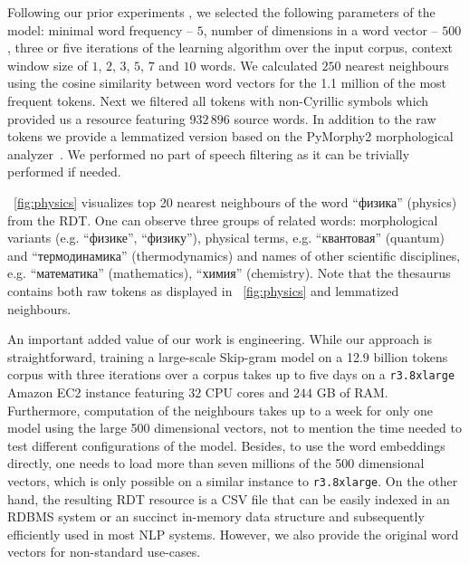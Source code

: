 \documentclass[runningheads,a4paper]{llncs}
\begin{document}
Following our prior experiments \cite{Arefyev:15}, we  selected the following parameters of the model: minimal word frequency -- $5$, number of dimensions in a word vector -- $500$, three or five iterations of the learning algorithm over the input corpus, context window size of $1$, $2$, $3$, $5$, $7$ and $10$ words. We calculated $250$ nearest neighbours using the cosine similarity between word vectors for the 1.1 million of the most frequent tokens. Next we filtered all tokens with non-Cyrillic symbols which provided us a resource featuring $932\,896$ source words. In addition to the raw tokens we provide a lemmatized version based on the PyMorphy2 morphological analyzer~\cite{Korobov:15}. We performed no part of speech filtering as it can be trivially performed if needed.  

\figurename~\ref{fig:physics} visualizes top 20  nearest neighbours of the word ``физика'' (physics) from the RDT. One can observe three groups of related words: morphological variants (e.g. ``физике'', ``физику''), physical terms, e.g. ``квантовая'' (quantum) and ``термодинамика'' (thermodynamics) and names of other scientific disciplines, e.g. ``математика'' (mathematics), ``химия'' (chemistry). Note that the thesaurus contains both raw tokens as displayed in \figurename~\ref{fig:physics} and lemmatized neighbours. 

An important added value of our work is engineering. While our approach is straightforward, training a large-scale Skip-gram model on a 12.9 billion tokens corpus with three iterations over a corpus takes up to five days on a \texttt{r3.8xlarge} Amazon EC2 instance featuring $32$ CPU cores and $244$ GB of RAM. Furthermore, computation of the neighbours takes up to a week for only one model using the large 500 dimensional vectors, not to mention the time needed to test different configurations of the model. Besides, to use the word embeddings directly, one needs to load more than seven millions of the 500 dimensional vectors, which is only possible on a similar instance to \texttt{r3.8xlarge}. On the other hand, the resulting RDT resource is a CSV file that can be easily indexed in an RDBMS system or an succinct in-memory data structure and subsequently efficiently used in most NLP systems. However, we also provide the original word vectors for non-standard use-cases. 
\end{document}

